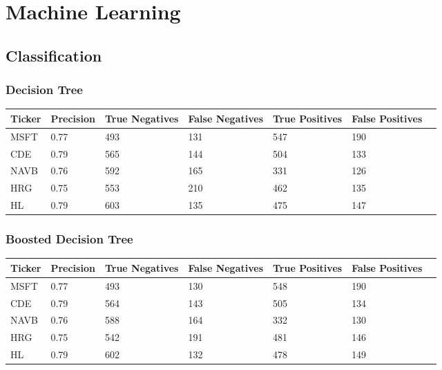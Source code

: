 \section{Machine Learning}

\subsection{Classification}

\subsubsection{Decision Tree}

\begin{center}
    \begin{tabular}{ | l | l | l | | l | l | l | p{5cm} |}
    \hline
    Ticker & Precision & True Negatives & False Negatives & True Positives & False Positives \\ \hline
    MSFT & 0.77 & 493 & 131 & 547 & 190 \\ \hline
    CDE & 0.79 & 565 & 144 & 504 & 133 \\ \hline
    NAVB & 0.76 & 592 & 165 & 331 & 126 \\ \hline
    HRG & 0.75 & 553 & 210 & 462 & 135 \\ \hline
    HL & 0.79 & 603 & 135 & 475 & 147 \\
    \hline
    \end{tabular}
    \label{table:nonfloat}
\end{center}

\subsubsection{Boosted Decision Tree}

\begin{center}
    \begin{tabular}{ | l | l | l | | l | l | l | p{5cm} |}
    \hline
    Ticker & Precision & True Negatives & False Negatives & True Positives & False Positives \\ \hline
    MSFT & 0.77 & 493 & 130 & 548 & 190 \\ \hline
    CDE & 0.79 & 564 & 143 & 505 & 134 \\ \hline
    NAVB & 0.76 & 588 & 164 & 332 & 130 \\ \hline
    HRG & 0.75 & 542 & 191 & 481 & 146 \\ \hline
    HL & 0.79 & 602 & 132 & 478 & 149 \\
    \hline
    \end{tabular}
    \label{table:nonfloat}
\end{center}

